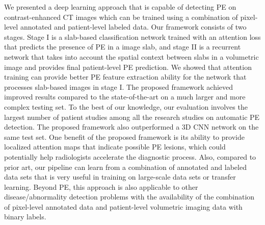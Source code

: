 \documentclass{midl} %
\begin{document}
We presented a deep learning approach that is capable of detecting PE on contrast-enhanced CT images which can be trained using a combination of pixel-level annotated and patient-level labeled data. Our framework consists of two stages. Stage I is a slab-based classification network trained with an attention loss that predicts the presence of PE in a image slab, and  stage II is a recurrent network that takes into account the spatial context between slabs in a volumetric image and provides final patient-level PE prediction. We showed that attention training can provide better PE feature extraction ability for the network that processes slab-based images in stage I. The proposed framework achieved improved results compared to the state-of-the-art on a much larger and more complex testing set. To the best of our knowledge, our evaluation involves the largest number of patient studies among all the research studies on automatic PE detection. The proposed framework also outperformed a 3D CNN network on the same test set. One benefit of the proposed framework is its ability to provide localized attention maps that indicate possible PE lesions, which could potentially help radiologists accelerate the diagnostic process. Also, compared to prior art, our pipeline can learn from a combination of annotated and labeled data sets that is very useful in training on large-scale data sets or transfer learning. Beyond PE, this approach is also applicable to other disease/abnormality detection problems with the availability of the combination of pixel-level annotated data and patient-level volumetric imaging data with binary labels.
\end{document}
